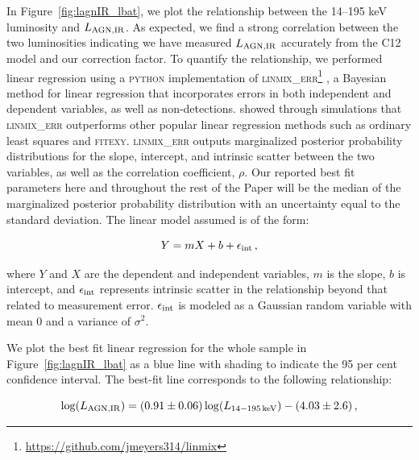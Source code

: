 \documentclass[fleqn, usenatbib]{mnras}
\begin{document}
In Figure~\ref{fig:lagnIR_lbat}, we plot the relationship between the 14--195 keV luminosity and $L_{\rm AGN,IR}$. As expected, we find a strong correlation between the two luminosities indicating we have measured $L_{\rm AGN,IR}$ accurately from the C12 model and our correction factor. To quantify the relationship, we performed linear regression using a \textsc{python} implementation of \textsc{linmix\_err}\footnote{\url{https://github.com/jmeyers314/linmix}} \citep{Kelly:2007lr}, a Bayesian method for linear regression that incorporates errors in both independent and dependent variables, as well as non-detections. \citet{Kelly:2007lr} showed through simulations that \textsc{linmix\_err} outperforms other popular linear regression methods such as ordinary least squares and \textsc{fitexy}. \textsc{linmix\_err} outputs marginalized posterior probability distributions for the slope, intercept, and intrinsic scatter between the two variables, as well as the correlation coefficient, $\rho$. Our reported best fit parameters here and throughout the rest of the Paper will be the median of the marginalized posterior probability distribution with an uncertainty equal to the standard deviation. The linear model assumed is of the form:

\begin{equation}\label{eqn:lin_mod}
Y = mX + b + \epsilon_{\rm int}\,,
\end{equation}

\noindent where $Y$ and $X$ are the dependent and independent variables, $m$ is the slope, $b$ is intercept, and $\epsilon_{\rm int}$ represents intrinsic scatter in the relationship beyond that related to measurement error. $\epsilon_{\rm int}$ is modeled as a Gaussian random variable with mean 0 and a variance of $\sigma^2$. 

We plot the best fit linear regression for the whole sample in Figure~\ref{fig:lagnIR_lbat} as a blue line with shading to indicate the 95 per cent confidence interval. The best-fit line corresponds to the following relationship:

\begin{equation}\label{eqn:lagnIR_lbat}
\log(L_{\rm AGN,IR}) =  (0.91\pm0.06)\log(L_{\rm 14-195\,keV}) - (4.03\pm2.6)\,,
\end{equation}
\end{document}
